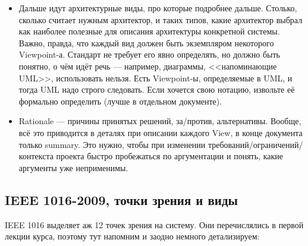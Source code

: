 \documentclass{../mcstext}
\begin{document}
\begin{itemize}
\begin{itemize}
        \end{itemize}
    \item Дальше идут архитектурные виды, про которые подробнее дальше. Столько, сколько считает нужным архитектор, и таких типов, какие архитектор выбрал как наиболее полезные для описания архитектуры конкретной системы. Важно, правда, что каждый вид должен быть экземпляром некоторого Viewpoint-а. Стандарт не требует его явно определять, но должно быть понятно, о чём идёт речь --- например, диаграммы, <<напоминающие UML>>, использовать нельзя. Есть Viewpoint-ы, определяемые в UML, и тогда UML надо строго следовать. Если хочется свою нотацию, извольте её формально определить (лучше в отдельном документе).
    \item Rationale --- причины принятых решений, за/против, альтернативы. Вообще, всё это приводится в деталях при описании каждого View, в конце документа только summary. Это нужно, чтобы при изменении требований/ограничений/контекста проекта быстро пробежаться по аргументации и понять, какие аргументы уже неприменимы.
\end{itemize}

\subsection{IEEE 1016-2009, точки зрения и виды}

IEEE 1016 выделяет аж 12 точек зрения на систему. Они перечислялись в первой лекции курса, поэтому тут напомним и заодно немного детализируем:
\end{document}
